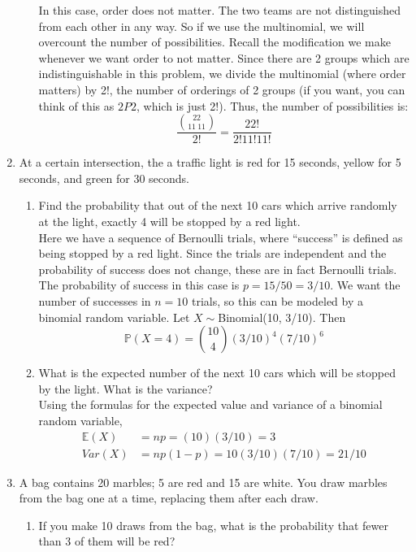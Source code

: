 \documentclass[12pt]{article}
\def\P{{\mathbb P}}
\def\E{{\mathbb E}}
\begin{document}
\begin{enumerate}
\begin{enumerate}
In this case, order does not matter. The two teams are not distinguished from each other in any way. So if we use the multinomial, we will overcount the number of possibilities. Recall the modification we make whenever we want order to not matter. Since there are 2 groups which are indistinguishable in this problem, we divide the multinomial (where order matters) by 2!, the number of orderings of 2 groups (if you want, you can think of this as $2P2$, which is just 2!). Thus, the number of possibilities is:
\[
\frac{ \binom{22}{11 \: 11}}{2!} = \frac{22!}{2! 11! 11!}
\]
\end{enumerate}

\item At a certain intersection, the a traffic light is red for 15 seconds, yellow for 5 seconds, and green for 30 seconds.  
\begin{enumerate}
\item Find the probability that out of the next 10 cars which arrive randomly at the light, exactly 4 will be stopped by a red light.\\

Here we have a sequence of Bernoulli trials, where ``success'' is defined as being stopped by a red light. Since the trials are independent and the probability of success does not change, these are in fact Bernoulli trials. The probability of success in this case is $p = 15 / 50 = 3/10$. We want the number of successes in $n = 10$ trials, so this can be modeled by a binomial random variable. Let $X \sim$Binomial(10, 3/10). Then
\[
\P(X = 4) = \binom{10}{4}(3/10)^4(7/10)^6
\]

\item What is the expected number of the next 10 cars which will be stopped by the light. What is the variance?\\

Using the formulas for the expected value and variance of a binomial random variable,
\begin{align*}
\E(X) &= np = (10)(3/10) = 3 \\
Var(X) &= np(1-p) = 10(3/10)(7/10) = 21/10
\end{align*}
\end{enumerate}

\item A bag contains 20 marbles; 5 are red and 15 are white. You draw marbles from the bag one at a time, replacing them after each draw.

\begin{enumerate}
\item If you make 10 draws from the bag, what is the probability that fewer than 3 of them will be red?\\


\end{enumerate}
\end{enumerate}
\end{document}
